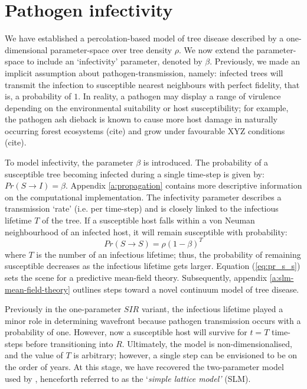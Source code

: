 

\section{Pathogen infectivity}
\label{ch3:two-param-model}

We have established a percolation-based model of tree disease described by a one-dimensional parameter-space over tree density $\rho$. %
We now extend the parameter-space to include an `infectivity' parameter, denoted by $\beta$. %
Previously, we made an implicit assumption about pathogen-transmission, namely: 
infected trees will transmit the infection to susceptible nearest neighbours with perfect fidelity, that is, a probability of $1$. 
In reality, a pathogen may display a range of virulence depending on the environmental suitability or host susceptibility; 
for example, the pathogen ash dieback is known to cause more host damage in naturally occurring forest ecosystems (cite) and grow under favourable XYZ conditions (cite).

To model infectivity, the parameter $\beta$ is introduced. The probability of a susceptible tree becoming infected during a single time-step is given by: $Pr(S \rightarrow I) = \beta$. Appendix \ref{a:propagation} contains more descriptive information on the computational implementation. 
The infectivity parameter describes a transmission `rate' (i.e. per time-step) and is closely linked to the infectious lifetime $T$ of the tree. %
If a susceptible host falls within a von Neuman neighbourhood of an infected host, it will remain susceptible with probability:
\begin{equation}
\label{eq:pr_s_s}
    Pr(S \rightarrow S) = \rho(1 -\beta)^T
\end{equation}
where $T$ is the number of an infectious lifetime;
thus, the probability of remaining susceptible decreases as the infectious lifetime gets larger.
Equation (\ref{eq:pr_s_s}) sets the scene for a predictive mean-field theory.
Subsequently, appendix \ref{a:slm-mean-field-theory} outlines steps toward a novel continuum model of tree disease.


Previously in the one-parameter $SIR$ variant, the infectious lifetime played a minor role in determining wavefront because pathogen transmission occurs with a probability of one.
However, now a susceptible host will survive for $t=T$ time-steps before transitioning into $R$. Ultimately, the model is non-dimensionalised, and the value of $T$ is arbitrary; however, a single step can be envisioned to be on the order of years.
At this stage, we have recovered the two-parameter model used by \cite{OROZCOFUENTES201912}, henceforth referred to as the `\textit{simple lattice model'} (SLM). 

